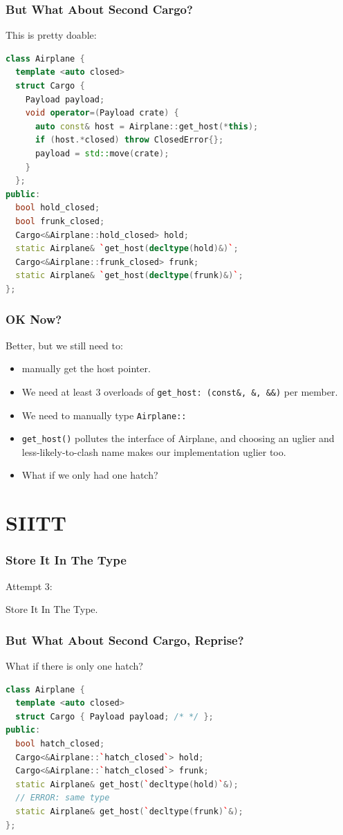 \documentclass{beamer}
\def\code#1{\texttt{#1}}
\newcommand{\nl}{\vspace{0.2\baselineskip}}
\newcommand{\HT}{{\Huge T}{\hspace{-5pt}}}
\newcommand{\HI}{{\Huge I}{\hspace{-1pt}}}
\newcommand{\HS}{{\Huge S}{\hspace{-1pt}}}
\begin{document}
\begin{frame}[fragile]
\frametitle{But What About Second Cargo?}
\begin{center}
  This is pretty doable:
\end{center}
\begin{lstlisting}[language=cpp]
class Airplane {
  template <auto closed>
  struct Cargo {
    Payload payload;
    void operator=(Payload crate) {
      auto const& host = Airplane::get_host(*this);
      if (host.*closed) throw ClosedError{};
      payload = std::move(crate);
    }
  };
public:
  bool hold_closed;
  bool frunk_closed;
  Cargo<&Airplane::hold_closed> hold;
  static Airplane& `get_host(decltype(hold)&)`;
  Cargo<&Airplane::frunk_closed> frunk; 
  static Airplane& `get_host(decltype(frunk)&)`;
};
\end{lstlisting}
\end{frame}


\begin{frame}[fragile]
\frametitle{OK Now?}
\begin{center}
  Better, but we still need to:
\end{center}
\begin{itemize}
  \item manually get the host pointer.
  \item We need at least 3 overloads of \code{get\_host: (const\&, \&, \&\&)}
    per member.
  \item We need to manually type \code{Airplane::}
  \item \code{get\_host()} pollutes the interface of Airplane, and choosing an
    uglier and less-likely-to-clash name makes our implementation uglier too.
  \item What if we only had one hatch?
\end{itemize}
\end{frame}


\section{SIITT}
\begin{frame}[fragile]
\frametitle{Store It In The Type}
\begin{center}
  Attempt 3:\nl\nl

  \HS tore \HI t \HI n \HT he \HT ype.
\end{center}
\end{frame}


\begin{frame}[fragile]
\frametitle{But What About Second Cargo, Reprise?}
\begin{center}
  What if there is only one hatch?
\end{center}
\begin{lstlisting}[language=cpp]
class Airplane {
  template <auto closed>
  struct Cargo { Payload payload; /* */ };
public:
  bool hatch_closed;
  Cargo<&Airplane::`hatch_closed`> hold;
  Cargo<&Airplane::`hatch_closed`> frunk;
  static Airplane& get_host(`decltype(hold)`&);
  // ERROR: same type
  static Airplane& get_host(`decltype(frunk)`&);
};
\end{lstlisting}
\end{frame}
\end{document}
